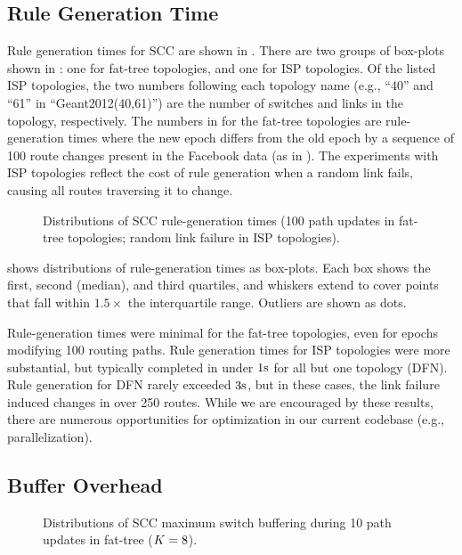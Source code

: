 \subsection{Rule Generation Time}
\label{sec:eval:rulegen}

Rule generation times for SCC are shown in .
There are two groups of box-plots shown in : one
for fat-tree topologies, and one for ISP topologies.  Of the listed
ISP topologies, the two numbers following each topology name (e.g.,
``40'' and ``61'' in ``Geant2012(40,61)'') are the number of switches
and links in the topology, respectively.  The numbers
in  for the fat-tree topologies are
rule-generation times where the new epoch differs from the old epoch
by a sequence of 100 route changes present in the Facebook data (as
in ).  The experiments with ISP topologies
reflect the cost of rule generation when a random link fails, causing
all routes traversing it to change.

\begin{figure}
\centering
  \resizebox{0.49\linewidth}{!}{}
  \caption{Distributions of SCC rule-generation times (100 path
  updates in fat-tree topologies; random link failure in ISP
  topologies).}
  \label{fig:rulegen}
\end{figure}


 shows distributions of rule-generation times
as box-plots.  Each box shows the first, second (median),
and third quartiles, and whiskers extend to cover points that fall
within $1.5\times$ the interquartile range.  Outliers are shown as
dots.

Rule-generation times were minimal for the fat-tree topologies, even
for epochs modifying 100 routing paths.  Rule
generation times for ISP topologies were more substantial, but
typically completed in under $1\textrm{s}$ for all but one topology (DFN).
Rule generation for DFN rarely exceeded $3\textrm{s}$, but in these cases,
the link failure induced changes in over 250 routes.  While we
are encouraged by these results, there are numerous opportunities for
optimization in our current codebase (e.g., parallelization).

\subsection{Buffer Overhead}
\label{sec:eval:buffer}

\begin{figure}
\centering
  \resizebox{0.49\linewidth}{!}{}
  \caption{Distributions of SCC maximum switch buffering during 10 path
  updates in fat-tree ($K = 8$).}
  \label{fig:buffer}
\end{figure}

